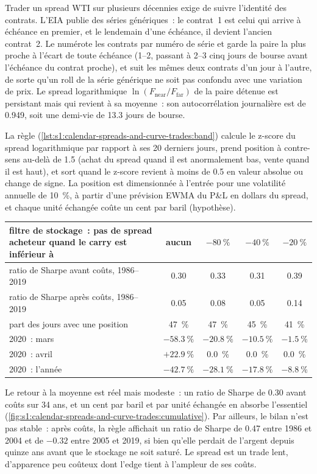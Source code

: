 Trader un spread WTI sur plusieurs décennies exige de suivre l'identité des contrats. L'EIA publie des séries génériques~: le contrat~1 est celui qui arrive à échéance en premier, et le lendemain
d'une échéance, il devient l'ancien contrat~2. Le  numérote les contrats par numéro de série et garde la paire la plus proche
à l'écart de toute échéance (1--2, passant à 2--3 cinq jours de bourse avant l'échéance du contrat proche), et suit les mêmes deux contrats d'un jour à l'autre, de sorte qu'un roll
de la série générique ne soit pas confondu avec une variation de prix. Le spread logarithmique $\ln(F_{\text{near}}/F_{\text{far}})$ de la paire détenue est persistant mais
qui revient à sa moyenne~: son autocorrélation journalière est de 0.949, soit une demi-vie de 13.3 jours de bourse.

La règle (\cref{lst:s1:calendar-spreads-and-curve-trades:band}) calcule le z-score du spread logarithmique par rapport à ses 20 derniers jours, prend position à contre-sens au-delà de 1.5
(achat du spread quand il est anormalement bas, vente quand il est haut), et sort quand le z-score revient à moins de 0.5 en valeur absolue ou change de signe. La position est
dimensionnée à l'entrée pour une volatilité annuelle de 10~\%, à partir d'une prévision EWMA du P\&L en dollars du spread, et chaque unité échangée coûte un cent par baril (hypothèse).

\begin{center}
\small
\begin{tabular}{@{}p{6.4cm}cccc@{}}
\toprule
filtre de stockage~: pas de spread acheteur quand le carry est inférieur à & aucun & $-80~\%$ & $-40~\%$ & $-20~\%$\\
\midrule
ratio de Sharpe avant coûts, 1986--2019 & 0.30 & 0.33 & 0.31 & 0.39\\
ratio de Sharpe après coûts, 1986--2019 & 0.05 & 0.08 & 0.05 & 0.14\\
part des jours avec une position & 47~\% & 47~\% & 45~\% & 41~\%\\
2020~: mars & $-58.3~\%$ & $-20.8~\%$ & $-10.5~\%$ & $-1.5~\%$\\
2020~: avril & $+22.9~\%$ & 0.0~\% & 0.0~\% & 0.0~\%\\
2020~: l'année & $-42.7~\%$ & $-28.1~\%$ & $-17.8~\%$ & $-8.8~\%$\\
\bottomrule
\end{tabular}
\end{center}

Le retour à la moyenne est réel mais modeste~: un ratio de Sharpe de 0.30 avant coûts sur 34 ans, et un cent par baril et par unité échangée en absorbe l'essentiel
(\cref{fig:s1:calendar-spreads-and-curve-trades:cumulative}). Par ailleurs, le bilan n'est pas stable~: après coûts, la règle affichait un ratio de Sharpe de 0.47 entre
1986 et 2004 et de $-0.32$ entre 2005 et 2019, si bien qu'elle perdait de l'argent depuis quinze ans avant que le stockage ne soit saturé. Le spread est un trade lent, d'apparence peu coûteux
dont l'edge tient à l'ampleur de ses coûts.

